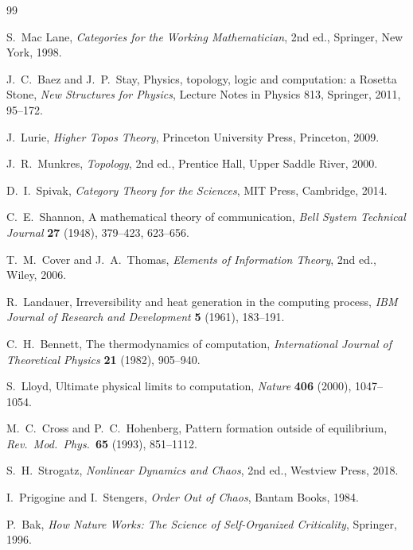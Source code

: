 \documentclass{amsart}
\theoremstyle{plain}
\theoremstyle{definition}
\theoremstyle{remark}
\begin{document}
\newpage
\begin{thebibliography}{99}

  S.\ Mac Lane,
  \textit{Categories for the Working Mathematician},
  2nd ed., Springer, New York, 1998.

  J.\ C.\ Baez and J.\ P.\ Stay,
  Physics, topology, logic and computation: a Rosetta Stone,
  \textit{New Structures for Physics}, Lecture Notes in Physics 813,
  Springer, 2011, 95--172.

  J.\ Lurie,
  \textit{Higher Topos Theory},
  Princeton University Press, Princeton, 2009.

  J.\ R.\ Munkres,
  \textit{Topology},
  2nd ed., Prentice Hall, Upper Saddle River, 2000.

  D.\ I.\ Spivak,
  \textit{Category Theory for the Sciences},
  MIT Press, Cambridge, 2014.

  C.\ E.\ Shannon,
  A mathematical theory of communication,
  \textit{Bell System Technical Journal} \textbf{27} (1948), 379--423, 623--656.

  T.\ M.\ Cover and J.\ A.\ Thomas,
  \textit{Elements of Information Theory},
  2nd ed., Wiley, 2006.

  R.\ Landauer,
  Irreversibility and heat generation in the computing process,
  \textit{IBM Journal of Research and Development} \textbf{5} (1961), 183--191.

  C.\ H.\ Bennett,
  The thermodynamics of computation,
  \textit{International Journal of Theoretical Physics} \textbf{21} (1982), 905--940.

  S.\ Lloyd,
  Ultimate physical limits to computation,
  \textit{Nature} \textbf{406} (2000), 1047--1054.

  M.\ C.\ Cross and P.\ C.\ Hohenberg,
  Pattern formation outside of equilibrium,
  \textit{Rev.\ Mod.\ Phys.}\ \textbf{65} (1993), 851--1112.

  S.\ H.\ Strogatz,
  \textit{Nonlinear Dynamics and Chaos},
  2nd ed., Westview Press, 2018.

  I.\ Prigogine and I.\ Stengers,
  \textit{Order Out of Chaos},
  Bantam Books, 1984.

  P.\ Bak,
  \textit{How Nature Works: The Science of Self-Organized Criticality},
  Springer, 1996.


\end{thebibliography}
\end{document}
